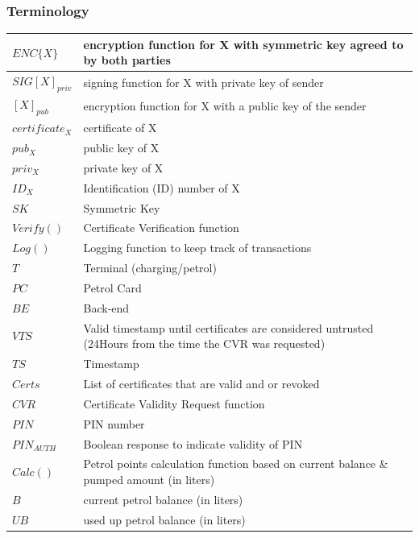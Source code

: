 \subsubsection{Terminology}
    \begin{center}
        \begin{tabular}{| l | p{8cm} |}
            \hline
            $ENC\{X\}$ & encryption function for X with symmetric key agreed to by both parties\\ \hline
            $SIG[X]_{priv}$ & signing function for X with private key of sender \\ \hline
            $[X]_{pub}$ & encryption function for X with a public key of the sender \\ \hline
            $certificate_{X}$ & certificate of X \\ \hline
            $pub_{X}$ & public key of X \\ \hline
            $priv_{X}$ & private key of X  \\ \hline
            $ID_{X}$ & Identification (ID) number of X \\ \hline
            $SK$ & Symmetric Key \\ \hline
            $Verify()$ & Certificate Verification function \\ \hline
            $Log()$ & Logging function to keep track of transactions \\ \hline
            $T$ & Terminal (charging/petrol) \\ \hline
            $PC$ & Petrol Card \\ \hline
            $BE$ & Back-end \\ \hline
            $VTS$ & Valid timestamp until certificates are considered untrusted (24Hours from the time the CVR was requested) \\ \hline
            $TS$ & Timestamp \\ \hline
            $Certs$ & List of certificates that are valid and or revoked \\ \hline
            $CVR$ & Certificate Validity Request function \\ \hline
            $PIN$ & PIN number \\ \hline
            $PIN_{AUTH}$ & Boolean response to indicate validity of PIN \\ \hline
            $Calc()$ & Petrol points calculation function based on current balance \& pumped amount (in liters) \\ \hline
            $B$ & current petrol balance (in liters) \\ \hline
            $UB$ & used up petrol balance (in liters) \\ \hline
        \end{tabular}
    \end{center}

